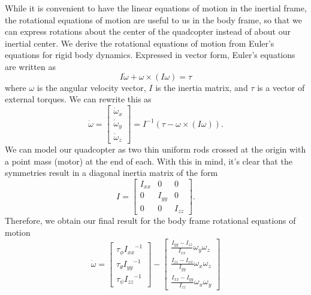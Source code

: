 \documentclass{article}
\newcommand\bmatr[1]{\begin{bmatrix} #1\end{bmatrix}}
\begin{document}
While it is convenient to have the linear equations of
motion in the inertial frame, the rotational equations of motion are useful to us in the body frame,
so that we can express rotations about the center of the quadcopter instead of about our inertial
center. We derive the rotational equations of motion from Euler's equations for rigid body dynamics. 
Expressed in vector form, Euler's equations are written as
\[I\dot\omega + \omega\times (I\omega) = \tau\]
where $\omega$ is the angular velocity vector, $I$ is the inertia matrix, and $\tau$ is a vector of
external torques. We can rewrite this as
\[ \dot\omega = \bmatr{\dot \omega_x \\ \dot \omega_y \\ \dot \omega_z} = I^{-1}\left(\tau - \omega\times (I\omega)\right).\]
We can model our quadcopter as two thin uniform rods crossed at the origin with a point mass (motor)
at the end of each. With this in mind, it's clear that the symmetries result in a diagonal inertia
matrix of the form
\[I = \bmatr{I_{xx} & 0 & 0 \\ 0 & I_{yy} & 0 \\ 0 & 0 & I_{zz}}.\]
Therefore, we obtain our final result for the body frame rotational equations of motion
\[\dot\omega = \bmatr{
    \tau_\phi {I_{xx}}^{-1} \\
    \tau_\theta {I_{yy}}^{-1} \\
    \tau_\psi {I_{zz}}^{-1}
} - \bmatr{
    \frac{I_{yy} - I_{zz}}{I_{xx}} \omega_y\omega_z \\ 
    \frac{I_{zz} - I_{xx}}{I_{yy}} \omega_x\omega_z  \\
    \frac{I_{xx} - I_{yy}}{I_{zz}} \omega_x\omega_y
}\]
\end{document}
